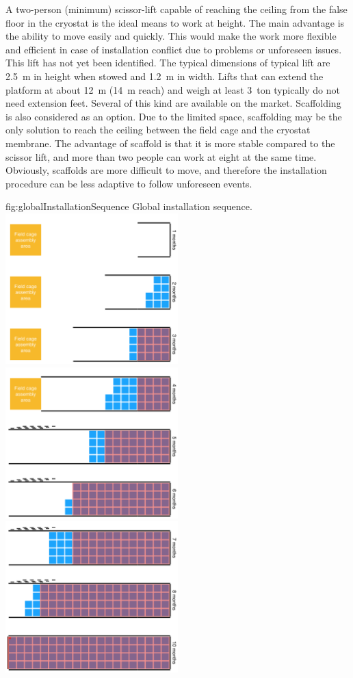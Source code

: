 A two-person (minimum) scissor-lift capable of reaching the ceiling from the false floor in the cryostat is the ideal means to work at height.
The main advantage is the ability to move easily and quickly.
This would make the work more flexible and efficient in case of installation conflict due to problems or unforeseen issues.
This lift has not yet been identified.
The typical dimensions of typical lift are 2.5~m in height when stowed and 1.2~m in width.
Lifts that can extend the platform at about 12~m (14~m reach) and weigh at least 3~ton typically do not need extension feet.
Several of this kind are available on the market.
Scaffolding is also considered as an option.
Due to the limited space, scaffolding may be the only solution to reach the ceiling between the field cage and the cryostat membrane.
The advantage of scaffold is that it is more stable compared to the scissor lift, and more than two people can work at eight at the same time.
Obviously, scaffolds are more difficult to move, and therefore the installation procedure can be less adaptive to follow unforeseen events.

\begin{dunefigure}{fig:globalInstallationSequence}
{Global installation sequence.}
\includegraphics[width=0.5\textwidth]{graphics/installationSequence1.png}
\includegraphics[width=0.5\textwidth]{graphics/installationSequence2.png}
\includegraphics[width=0.5\textwidth]{graphics/installationSequence3.png}
\end{dunefigure}

